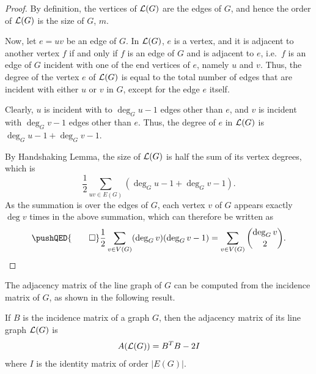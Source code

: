 \begin{proof}
By definition, the vertices of $\operatorname{\mathcal L}(G)$ are the edges of $G$, and hence the order of $\operatorname{\mathcal L}(G)$ is the size of $G$, $m$.

Now, let $e = uv$ be an edge of $G$. In $\operatorname{\mathcal L}(G)$, $e$ is a vertex, and it is adjacent to another vertex $f$ if and only if $f$ is an edge of $G$ and is adjacent to $e$, i.e.\ $f$ is an edge of $G$ incident with one of the end vertices of $e$, namely $u$ and $v$. Thus, the degree of the vertex $e$ of $\operatorname{\mathcal L}(G)$ is equal to the total number of edges that are incident with either $u$ or $v$ in $G$, except for the edge $e$ itself.

Clearly, $u$ is incident with to $\deg_G u - 1$ edges other than $e$, and $v$ is incident with $\deg_G v - 1$ edges other than $e$. Thus, the degree of $e$ in $\operatorname{\mathcal L}(G)$ is $\deg_G u  - 1 + \deg_G v - 1$.

By Handshaking Lemma, the size of $\operatorname{\mathcal L}(G)$ is half the sum of its vertex degrees, which is
\begin{equation*}
	\frac 1 2 \sum_{uv \in E(G)} (\deg_G u - 1 + \deg_G v - 1).
\end{equation*}
As the summation is over the edges of $G$, each vertex $v$ of $G$ appears exactly $\deg v$ times in the above summation, which can therefore be written as
\begin{equation*}
	\pushQED{\qed}
	\frac 1 2 \sum_{v \in V(G)} (\deg_G v)(\deg_G v - 1) = \sum_{v \in V(G)} \binom{\deg_G v}{2}.\qedhere
\end{equation*}
\end{proof}

The adjacency matrix of the line graph of $G$ can be computed from the incidence matrix of $G$, as shown in the following result.

\begin{Theorem}
	If $B$ is the incidence matrix of a graph $G$, then the adjacency matrix of its line graph $\operatorname{\mathcal L}(G)$ is
	\begin{equation*}
		A\pqty{\LG(G)} = B^T B - 2I
	\end{equation*}
	where $I$ is the identity matrix of order $|E(G)|$.
\end{Theorem}

